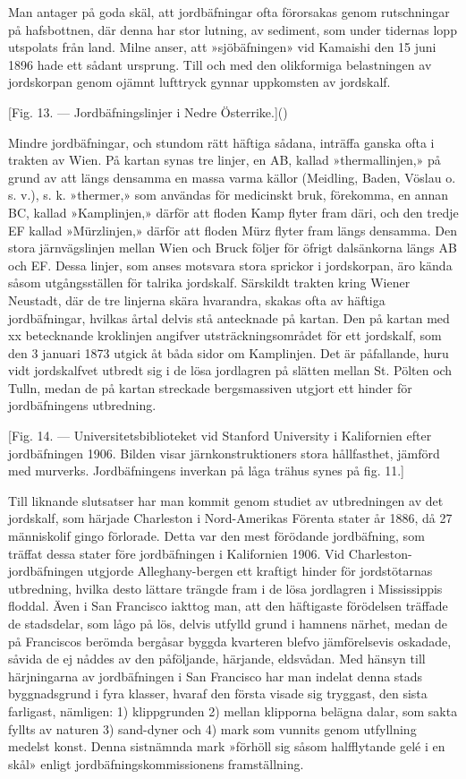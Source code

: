 \documentclass[a4paper, 12pt, oneside, swedish]{article}
\begin{document}
Man antager på goda skäl, att jordbäfningar ofta förorsakas genom rutschningar på hafsbottnen, där denna har stor lutning, av sediment, som under tidernas lopp utspolats från land. Milne anser, att »sjöbäfningen» vid Kamaishi den 15 juni 1896 hade ett sådant ursprung. Till och med den olikformiga belastningen av jordskorpan genom ojämnt lufttryck gynnar uppkomsten av jordskalf.

[Fig. 13. --- Jordbäfningslinjer i Nedre Österrike.]()

Mindre jordbäfningar, och stundom rätt häftiga sådana, inträffa ganska ofta i trakten av Wien. På kartan synas tre linjer, en AB, kallad »thermallinjen,» på grund av att längs densamma en massa varma källor (Meidling, Baden, Vöslau o. s. v.), s. k. »thermer,» som användas för medicinskt bruk, förekomma, en annan BC, kallad »Kamplinjen,» därför att floden Kamp flyter fram däri, och den tredje EF kallad »Mürzlinjen,» därför att floden Mürz flyter fram längs densamma. Den stora järnvägslinjen mellan Wien och Bruck följer för öfrigt dalsänkorna längs AB och EF. Dessa linjer, som anses motsvara stora sprickor i jordskorpan, äro kända såsom utgångsställen för talrika jordskalf. Särskildt trakten kring Wiener Neustadt, där de tre linjerna skära hvarandra, skakas ofta av häftiga jordbäfningar, hvilkas årtal delvis stå antecknade på kartan. Den på kartan med xx betecknande kroklinjen angifver utsträckningsområdet för ett jordskalf, som den 3 januari 1873 utgick åt båda sidor om Kamplinjen. Det är påfallande, huru vidt jordskalfvet utbredt sig i de lösa jordlagren på slätten mellan St. Pölten och Tulln, medan de på kartan streckade bergsmassiven utgjort ett hinder för jordbäfningens utbredning.

[Fig. 14. --- Universitetsbiblioteket vid Stanford University i Kalifornien efter jordbäfningen 1906. Bilden visar järnkonstruktioners stora hållfasthet, jämförd med murverks. Jordbäfningens inverkan på låga trähus synes på fig. 11.]

Till liknande slutsatser har man kommit genom studiet av utbredningen av det jordskalf, som härjade Charleston i Nord-Amerikas Förenta stater år 1886, då 27 människolif gingo förlorade. Detta var den mest förödande jordbäfning, som träffat dessa stater före jordbäfningen i Kalifornien 1906. Vid Charleston-jordbäfningen utgjorde Alleghany-bergen ett kraftigt hinder för jordstötarnas utbredning, hvilka desto lättare trängde fram i de lösa jordlagren i Mississippis floddal. Även i San Francisco iakttog man, att den häftigaste förödelsen träffade de stadsdelar, som lågo på lös, delvis utfylld grund i hamnens närhet, medan de på Franciscos berömda bergåsar byggda kvarteren blefvo jämförelsevis oskadade, såvida de ej nåddes av den påföljande, härjande, eldsvådan. Med hänsyn till härjningarna av jordbäfningen i San Francisco har man indelat denna stads byggnadsgrund i fyra klasser, hvaraf den första visade sig tryggast, den sista farligast, nämligen: 1) klippgrunden 2) mellan klipporna belägna dalar, som sakta fyllts av naturen 3) sand-dyner och 4) mark som vunnits genom utfyllning medelst konst. Denna sistnämnda mark »förhöll sig såsom halfflytande gelé i en skål» enligt jordbäfningskommissionens framställning.
\end{document}
